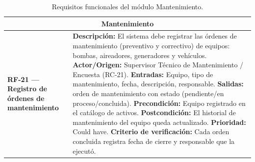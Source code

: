 \documentclass[11pt,a4paper]{article}
\begin{document}
\begin{longtable}{|p{3.5cm}|p{12cm}|}
\caption{Requisitos funcionales del módulo Mantenimiento.}
\label{tab:rf-mantenimiento} \\
\hline

\multicolumn{2}{|c|}{\textbf{Mantenimiento}} \\ \hline

\textbf{RF-21 — Registro de órdenes de mantenimiento} &
\textbf{Descripción:} El sistema debe registrar las órdenes de mantenimiento (preventivo y correctivo) de equipos: bombas, aireadores, generadores y vehículos. \newline
\textbf{Actor/Origen:} Supervisor Técnico de Mantenimiento / Encuesta (RC-21). \newline
\textbf{Entradas:} Equipo, tipo de mantenimiento, fecha, descripción, responsable. \newline
\textbf{Salidas:} orden de mantenimiento con estado (pendiente/en proceso/concluida). \newline
\textbf{Precondición:} Equipo registrado en el catálogo de activos. \newline
\textbf{Postcondición:} El historial de mantenimiento del equipo queda actualizado. \newline
\textbf{Prioridad:} Could have. \newline
\textbf{Criterio de verificación:} Cada orden concluida registra fecha de cierre y responsable que la ejecutó. \\ \hline

\end{longtable}
\end{document}
